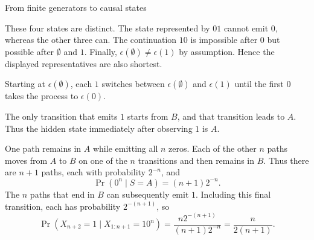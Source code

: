 \begin{exercise}[Extension]{From finite generators to causal states}
\begin{solution}
\begin{parts}
\begin{subparts}
            These four states are distinct. The state represented by $01$
            cannot emit $0$, whereas the other three can. The continuation
            $10$ is impossible after $0$ but possible after $\emptyset$ and
            $1$. Finally, $\epsilon(\emptyset)\neq\epsilon(1)$ by assumption.
            Hence the displayed representatives are also shortest.

            Starting at $\epsilon(\emptyset)$, each $1$ switches between
            $\epsilon(\emptyset)$ and $\epsilon(1)$ until the first $0$
            takes the process to $\epsilon(0)$.
            \par\nobreak
            {\centering
              \par}
        \end{subparts}

      \item
        \begin{subparts}
          \item The only transition that emits $1$ starts from $B$, and that
            transition leads to $A$. Thus the hidden state immediately after
            observing $1$ is $A$.

          \item One path remains in $A$ while emitting all $n$ zeros. Each of
            the other $n$ paths moves from $A$ to $B$ on one of the $n$
            transitions and then remains in $B$. Thus there are $n+1$ paths,
            each with probability $2^{-n}$, and
            \[
              \Pr(0^n\mid S=A)=(n+1)2^{-n}.
            \]
            The $n$ paths that end in $B$ can subsequently emit $1$. Including
            this final transition, each has probability $2^{-(n+1)}$, so
            \[
              \Pr(X_{n+2}=1\mid X_{1:n+1}=10^n)
                =\frac{n2^{-(n+1)}}{(n+1)2^{-n}}
                =\frac{n}{2(n+1)}.
            \]


\end{subparts}
\end{parts}
\end{solution}
\end{exercise}
